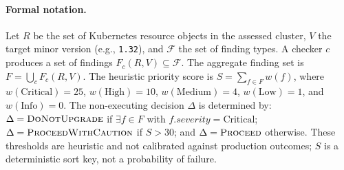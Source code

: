 \documentclass[10pt,journal]{IEEEtran}
\newcommand{\code}[1]{\texttt{#1}}
\begin{document}
\paragraph{Formal notation.}
Let $R$ be the set of Kubernetes resource objects in the assessed cluster, $V$ the target minor version (e.g., \code{1.32}), and $\mathcal{F}$ the set of finding types. A checker $c$ produces a set of findings $F_c(R,V) \subseteq \mathcal{F}$. The aggregate finding set is $F = \bigcup_c F_c(R,V)$. The heuristic priority score is $S = \sum_{f \in F} w(f)$, where $w(\text{Critical}) = 25$, $w(\text{High}) = 10$, $w(\text{Medium}) = 4$, $w(\text{Low}) = 1$, and $w(\text{Info}) = 0$. The non-executing decision $\Delta$ is determined by: $\Delta = \textsc{DoNotUpgrade}$ if $\exists f \in F$ with $f.\mathit{severity} = \text{Critical}$; $\Delta = \textsc{ProceedWithCaution}$ if $S > 30$; and $\Delta = \textsc{Proceed}$ otherwise. These thresholds are heuristic and not calibrated against production outcomes; $S$ is a deterministic sort key, not a probability of failure.
\end{document}
